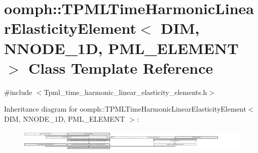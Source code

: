 \hypertarget{classoomph_1_1TPMLTimeHarmonicLinearElasticityElement}{}\section{oomph\+:\+:T\+P\+M\+L\+Time\+Harmonic\+Linear\+Elasticity\+Element$<$ D\+IM, N\+N\+O\+D\+E\+\_\+1D, P\+M\+L\+\_\+\+E\+L\+E\+M\+E\+NT $>$ Class Template Reference}
\label{classoomph_1_1TPMLTimeHarmonicLinearElasticityElement}


{\ttfamily \#include $<$Tpml\+\_\+time\+\_\+harmonic\+\_\+linear\+\_\+elasticity\+\_\+elements.\+h$>$}

Inheritance diagram for oomph\+:\+:T\+P\+M\+L\+Time\+Harmonic\+Linear\+Elasticity\+Element$<$ D\+IM, N\+N\+O\+D\+E\+\_\+1D, P\+M\+L\+\_\+\+E\+L\+E\+M\+E\+NT $>$\+:\begin{figure}[H]
\begin{center}
\leavevmode
\includegraphics[height=1.056604cm]{classoomph_1_1TPMLTimeHarmonicLinearElasticityElement}
\end{center}
\end{figure}
